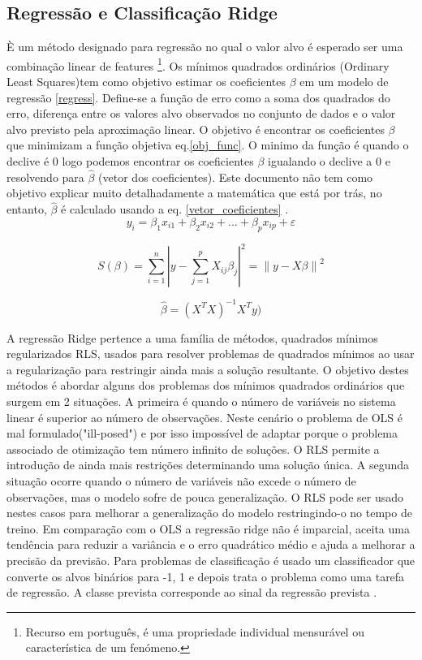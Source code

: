 \subsection{Regressão e Classificação Ridge}\label{RCR}
È um método designado para regressão no qual o valor alvo é esperado ser uma combinação linear de features \footnote{Recurso em português, é uma propriedade individual mensurável ou característica de um fenómeno.}.
Os mínimos quadrados ordinários (Ordinary Least Squares)tem como objetivo estimar os coeficientes $\beta$  em um modelo de regressão \ref{regress}. Define-se a função de erro como a soma dos quadrados do erro, diferença entre os valores alvo observados no conjunto de dados e o valor alvo previsto pela aproximação linear. O objetivo é encontrar os coeficientes $\beta$ que minimizam a função objetiva eq.\ref{obj_func}. O minimo da função é quando o declive é 0 logo podemos encontrar os coeficientes $\beta$ igualando o declive a 0 e resolvendo para $\hat{\beta}$ (vetor dos coeficientes). Este documento não tem como objetivo explicar muito detalhadamente a matemática que está por trás, no entanto, $\hat{\beta}$ é calculado usando a eq. \ref{vetor_coeficientes} \cite{regression1}.
\begin{equation}
y_{i} = \beta _{1}x_{i1} + \beta _{2}x_{i2} + ... + \beta _{p}x_{ip} + \varepsilon 
\label{regress}
\end{equation}

\begin{equation}
S(\beta ) = \sum_{i=1}^{n}\left | y - \sum_{j=1}^{p}X_{ij}\beta _{j} \right |^{2} =\left \| y - X\beta  \right \|^{2}
\label{obj_func}
\end{equation}
 
\begin{equation}
\hat{\beta} = (X^{T}X)^{-1}X^{T}y)
\label{vetor_coeficientes}
\end{equation} 
 
 
A regressão Ridge pertence a uma família de métodos, quadrados mínimos regularizados RLS, usados para resolver problemas de quadrados mínimos ao usar a regularização para restringir ainda mais a solução resultante.
O objetivo destes métodos é abordar alguns dos problemas dos mínimos quadrados ordinários que surgem em 2 situações. A primeira é quando o número de variáveis no sistema linear é superior ao número de observações. Neste cenário o problema de OLS é mal formulado("ill-posed") e por isso impossível de adaptar porque o problema associado de otimização tem número infinito de soluções. O RLS permite a introdução de ainda mais restrições determinando uma solução única.  A segunda situação ocorre quando o número de variáveis não excede o número de observações, mas o modelo sofre de pouca generalização. O RLS pode ser usado nestes casos para melhorar a generalização do modelo restringindo-o no tempo de treino.
Em comparação com o OLS a regressão ridge não é imparcial, aceita uma tendência para reduzir a variância e o erro quadrático médio e ajuda a melhorar a precisão da previsão. 
Para problemas de classificação é usado um classificador que converte os alvos binários para {-1, 1} e depois trata o problema como uma tarefa de regressão. A classe prevista corresponde ao sinal da regressão prevista \cite{scikit-learn}.

